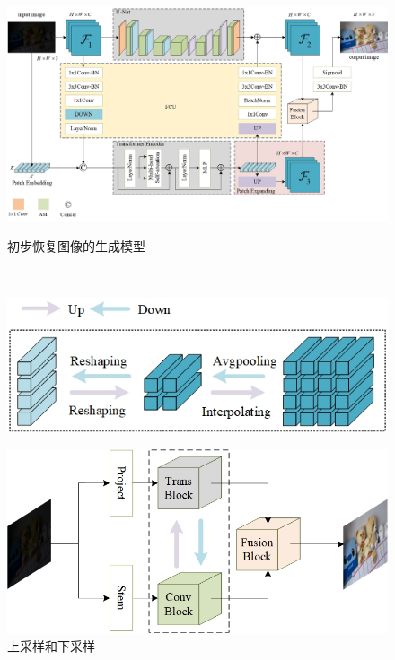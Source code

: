 \documentclass[CJK,aspectratio=169]{beamer}  %
\begin{document}
\begin{frame}
\begin{figure}
\begin{minipage}{.4\textwidth}
\begin{itemize}
				\end{itemize}
				\captionsetup{font=scriptsize}
				\label{fig: Abstract}
			\end{minipage}
			\begin{minipage}{.58\textwidth}
				\centering
				\includegraphics[width=.88\linewidth]{picture/LLIE/My Architecture/The proposed initial architecture.jpg}
				\captionsetup{font=scriptsize}
				\label{fig: PACUT}	
				\caption*{\tiny 初步恢复图像的生成模型}
			\end{minipage}\\
			\hfill
			\begin{minipage}{.28\textwidth}
				\includegraphics[width=.88\linewidth]{picture/LLIE/My Architecture/Up-sampling and down-sampling.jpg}
				\captionsetup{font=scriptsize}
				\label{fig: Up-sampling and down-sampling}	
				\caption*{\tiny 上采样和下采样}
			\end{minipage}
			\begin{minipage}{.28\textwidth}
				\includegraphics[width=.88\linewidth]{picture/LLIE/My Architecture/The proposed initial architecture(Abstract Picture).jpg}

\end{minipage}
\end{figure}
\end{frame}
\end{document}
